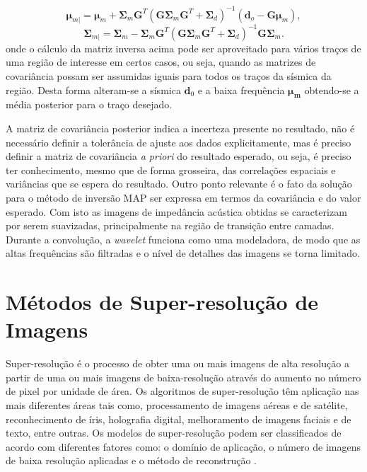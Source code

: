 \begin{equation}
\label{eqn:mapSolution}
\boldsymbol{\mu}_{m|} = \boldsymbol{\mu}_{m} + \boldsymbol{\Sigma}_{m}\boldsymbol{G}^{T}(\boldsymbol{G\Sigma}_{m}\boldsymbol{G}^{T}+\boldsymbol{\Sigma}_{d})^{-1}\left ( \boldsymbol{d}_{o} - \boldsymbol{G\mu}_{m} \right ),
\end{equation}
\begin{equation}
\boldsymbol{\Sigma}_{m|} = \boldsymbol{\Sigma}_{m} - \boldsymbol{\Sigma}_{m}\boldsymbol{G}^{T}(\boldsymbol{G\Sigma}_{m}\boldsymbol{G}^{T}+\boldsymbol{\Sigma}_{d})^{-1}\boldsymbol{G\Sigma}_{m}.
\end{equation} 
onde o cálculo da matriz inversa acima pode ser aproveitado para vários traços
de uma região de interesse em certos casos, ou seja, quando as matrizes de
covariância possam ser assumidas iguais para todos os traços da sísmica da região.
Desta forma alteram-se a sísmica $\mathbf{d}_0$ e a baixa frequência
$\boldsymbol{\mu_m}$ obtendo-se a média posterior para o traço desejado.
  
A matriz de covariância posterior indica a incerteza
presente no resultado, não é necessário
definir a tolerância de ajuste aos dados explicitamente, mas é preciso definir a
matriz de covariância \textit{a priori} do resultado esperado, ou seja, é
preciso ter conhecimento, mesmo que de forma grosseira, das correlações espaciais e
variâncias que se espera do resultado. Outro ponto relevante é o fato da
solução para o método de inversão MAP ser expressa em termos da covariância
e do valor esperado. Com isto as imagens de impedância acústica obtidas
se caracterizam por serem suavizadas, principalmente na região de
transição entre camadas. Durante a convolução, a \textit{wavelet} funciona
como uma modeladora, de modo que as altas frequências são filtradas
e o nível de detalhes das imagens se torna limitado. 

\section{Métodos de Super-resolução de Imagens}
Super-resolução é o processo de obter uma ou mais imagens de alta
resolução a partir de uma ou mais imagens de baixa-resolução
através do aumento no número de pixel por unidade de área.
Os algoritmos de super-resolução têm aplicação nas mais diferentes áreas
tais como, processamento de imagens aéreas e de satélite, reconhecimento de
íris, holografia digital, melhoramento de imagens faciais e de texto, entre
outras. Os modelos de super-resolução podem ser classificados
de acordo com diferentes fatores como: o domínio de aplicação,
o número de imagens de baixa resolução aplicadas e o método de reconstrução \citep{Nasrollahi2014}.

